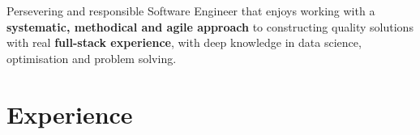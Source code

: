 \documentclass[10pt,a4paper,sans]{moderncv}        %
\begin{document}
\makecvtitle

Persevering and responsible Software Engineer that enjoys working with a \textbf{systematic, methodical and agile approach} to constructing quality solutions with real \textbf{full-stack experience}, with deep knowledge in data science, optimisation and problem solving.
\\

\section{Experience}
\end{document}

